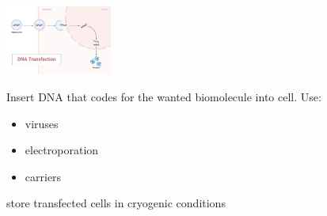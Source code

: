 \begin{minipage}{0.50\linewidth}
\includegraphics[width=35mm]{src/Images/transfection.png}
\end{minipage}
\begin{minipage}{0.45\linewidth}
    Insert DNA that codes for the wanted biomolecule into cell. Use:
    \begin{itemize}
        \item viruses
        \item electroporation
        \item carriers
    \end{itemize}
    store transfected cells in cryogenic conditions
\end{minipage}



